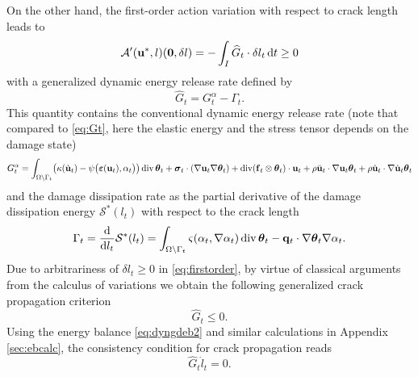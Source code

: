 On the other hand, the first-order action variation with respect to crack length leads to
\begin{equation} \label{eq:firstorder}
\mathcal{A}'(\vec{u}^*,l)(\vec{0},\delta l)=-\int_I\widehat{G}_t\cdot\delta l_t\D{t}\geq 0
\end{equation}
with a generalized dynamic energy release rate defined by
\begin{equation} \label{eq:GtG}
\widehat{G}_t=G_t^\alpha-\Gamma_t.
\end{equation}
This quantity contains the conventional dynamic energy release rate (note that compared to \eqref{eq:Gt}, here the elastic energy and the stress tensor depends on the damage state)
\begin{equation} \label{eq:GtC}
G_t^\alpha=\int_\domaint\bigl(\kappa(\dot{\vec{u}}_t)-\psi\bigl(\eps(\vec{u}_t),\alpha_t\bigr)\bigr)\div\vtheta_t+\sig_t\cdot(\nabla\vec{u}_t\nabla\vtheta_t)+\div(\vec{f}_t\otimes\vtheta_t)\cdot\vec{u}_t+\rho\ddot{\vec{u}}_t\cdot\nabla\vec{u}_t\vtheta_t+\rho\dot{\vec{u}}_t\cdot\nabla\dot{\vec{u}}_t\vtheta_t
\end{equation}
and the damage dissipation rate as the partial derivative of the damage dissipation energy $\mathcal{S}^*(l_t)$ with respect to the crack length
\begin{equation} \label{eq:Gammat}
\Gamma_t=\frac{\md}{\md l_t}\mathcal{S}^*(l_t)=\int_\domaint\varsigma(\alpha_t,\nabla\alpha_t)\div\vtheta_t-\vec{q}_t\cdot\nabla\vtheta_t\nabla\alpha_t.
\end{equation}
Due to arbitrariness of $\delta l_t\geq 0$ in \eqref{eq:firstorder}, by virtue of classical arguments from the calculus of variations we obtain the following generalized crack propagation criterion
\begin{equation} \label{eq:stab}
\widehat{G}_t\leq 0.
\end{equation}
Using the energy balance \eqref{eq:dyngdeb2} and similar calculations in Appendix \ref{sec:ebcalc}, the consistency condition for crack propagation reads
\begin{equation} \label{eq:ebG}
\widehat{G}_t\dot{l}_t=0.
\end{equation}

